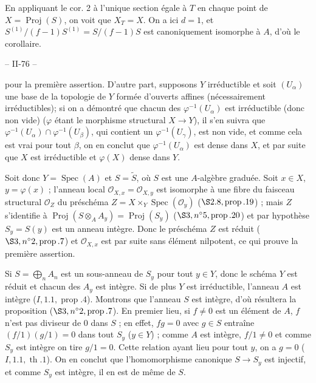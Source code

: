 En appliquant le cor. 2 à l'unique section égale à $T$ en chaque point de $X = \operatorname{Proj}(S)$, on voit que $X_T = X$. On a ici $d=1$, et $S^{(1)} / (f-1)S^{(1)} = S / (f-1)S$ est canoniquement isomorphe à $A$, d'où le corollaire.

\newpage


-- II-76 --

pour la première assertion. D'autre part, supposons $Y$ irréductible et soit $(U_\alpha)$ une base de la topologie de $Y$ formée d'ouverts affines (nécessairement irréductibles); si on a démontré que chacun des $\varphi^{-1}(U_\alpha)$ est irréductible (donc non vide) ($\varphi$ étant le morphisme structural $X \to Y$), il s'en suivra que $\varphi^{-1}(U_\alpha) \cap \varphi^{-1}(U_\beta)$, qui contient un $\varphi^{-1}(U_\gamma)$, est non vide, et comme cela est vrai pour tout $\beta$, on en conclut que $\varphi^{-1}(U_\alpha)$ est dense dans $X$, et par suite que $X$ est irréductible et $\varphi(X)$ dense dans $Y$.

Soit donc $Y = \operatorname{Spec}(A)$ et $S = \tilde{S}$, où $S$ est une $A$-algèbre graduée. Soit $x \in X$, $y = \varphi(x)$ ; l'anneau local $\mathcal{O}_{X,x} = \mathcal{O}_{X,y}$ est isomorphe à une fibre du faisceau structural $\mathcal{O}_Z$ du préschéma $Z = X \times_Y \operatorname{Spec}(\mathcal{O}_y)$ ($\S 2.8, \operatorname{prop}. 19$) ; mais $Z$ s'identifie à $\operatorname{Proj}(S \otimes_A A_y) = \operatorname{Proj}(S_y)$ ($\S 3, n^\circ 5, \operatorname{prop}. 20$) et par hypothèse $S_y = S(y)$ est un anneau intègre. Donc le préschéma $Z$ est réduit ($\S 3, n^\circ 2, \operatorname{prop}. 7$) et $\mathcal{O}_{X,x}$ est par suite sans élément nilpotent, ce qui prouve la première assertion.

Si $S = \bigoplus_n A_n$ est un sous-anneau de $S_y$ pour tout $y \in Y$, donc le schéma $Y$ est réduit et chacun des $A_y$ est intègre. Si de plus $Y$ est irréductible, l'anneau $A$ est intègre ($I, 1.1, \operatorname{prop}. 4$). Montrons que l'anneau $S$ est intègre, d'où résultera la proposition ($\S 3, n^\circ 2, \operatorname{prop}. 7$). En premier lieu, si $f \neq 0$ est un élément de $A$, $f$ n'est pas diviseur de $0$ dans $S$ ; en effet, $fg = 0$ avec $g \in S$ entraîne $(f/1)(g/1) = 0$ dans tout $S_y$ ($y \in Y$) ; comme $A$ est intègre, $f/1 \neq 0$ et comme $S_y$ est intègre on tire $g/1 = 0$. Cette relation ayant lieu pour tout $y$, on a $g=0$ ($I, 1.1, \operatorname{th}. 1$). On en conclut que l'homomorphisme canonique $S \to S_y$ est injectif, et comme $S_y$ est intègre, il en est de même de $S$.

